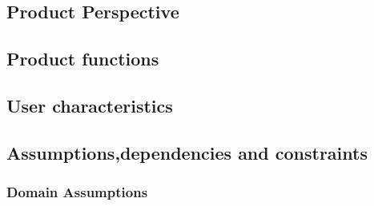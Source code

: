 \subsection{Product Perspective}






\subsection{Product functions}




\subsection{User characteristics}



\subsection{Assumptions,dependencies and constraints}
\subsubsection{Domain Assumptions}

